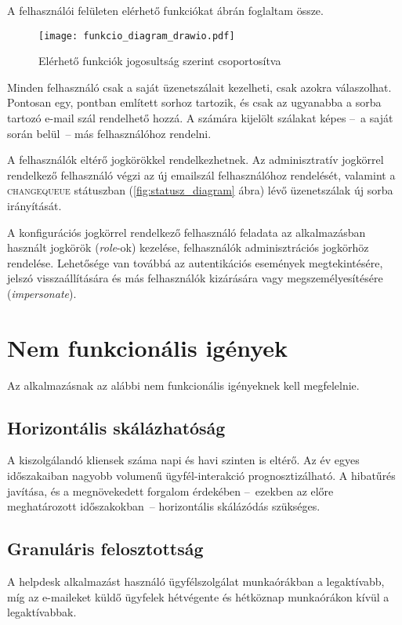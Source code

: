 A felhasználói felületen elérhető funkciókat  ábrán foglaltam össze.

\begin{figure}[hbt] 
	\centering
	\texttt{[image: funkcio\_diagram\_drawio.pdf]}
	\caption[Elérhető funkciók]{Elérhető funkciók jogosultság szerint csoportosítva}
	\label{fig:funkcio_diagram}
\end{figure}


Minden felhasználó csak a saját üzenetszálait kezelheti, csak azokra válaszolhat. Pontosan egy,   pontban említett sorhoz tartozik, és csak az ugyanabba a sorba tartozó e-mail szál rendelhető hozzá. A számára kijelölt szálakat képes --~a saját során belül~-- más felhasználóhoz rendelni. 

A felhasználók eltérő jogkörökkel rendelkezhetnek. Az adminisztratív jogkörrel rendelkező felhasználó végzi az új emailszál felhasználóhoz rendelését, valamint a \foreignlanguage{british}{\textsc{change\textunderscore queue}} státuszban (\ref{fig:statusz_diagram} ábra) lévő üzenetszálak új sorba irányítását.


A konfigurációs jogkörrel rendelkező felhasználó feladata az alkalmazásban használt jogkörök (\foreignlanguage{british}{\emph{role}}-ok) kezelése, felhasználók adminisztrációs jogkörhöz rendelése. Lehetősége van továbbá az autentikációs események megtekintésére, jelszó visszaállítására és más felhasználók kizárására vagy megszemélyesítésére (\foreignlanguage{british}{\emph{impersonate}}).


\section{Nem funkcionális igények}
Az alkalmazásnak az alábbi nem funkcionális igényeknek kell megfelelnie.
	

\subsection[Skálázhatóság]{Horizontális skálázhatóság}
A kiszolgálandó kliensek száma napi és havi szinten is eltérő. Az év egyes időszakaiban nagyobb volumenű ügyfél-interakció prognosztizálható. A hibatűrés javítása, és a megnövekedett forgalom érdekében --~ezekben az előre meghatározott időszakokban~--  horizontális skálázódás szükséges.


\subsection{Granuláris felosztottság}\label{sec:granularitas}
A \foreignlanguage{british}{helpdesk} alkalmazást használó ügyfélszolgálat munkaórákban a legaktívabb, míg az e-maileket küldő ügyfelek hétvégente és hétköznap munkaórákon kívül a legaktívabbak.

